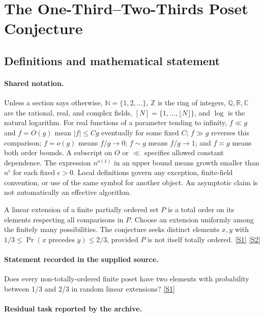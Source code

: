 \documentclass[11pt,a4paper]{article}
\newcommand{\N}{\mathbb{N}}
\newcommand{\Z}{\mathbb{Z}}
\newcommand{\Q}{\mathbb{Q}}
\newcommand{\R}{\mathbb{R}}
\newcommand{\C}{\mathbb{C}}
\newcommand{\sref}[2]{\hyperlink{source:#1:#2}{[S#2]}}
\begin{document}
\section{The One-Third--Two-Thirds Poset Conjecture}\label{statement}


\subsection{Definitions and mathematical statement}

\paragraph{Shared notation.}Unless a section says otherwise, $\N=\{1,2,\ldots\}$,
$\Z$ is the ring of integers, $\Q,\R,\C$ are the rational, real, and complex
fields, $[N]=\{1,\ldots,\lfloor N\rfloor\}$, and $\log$ is the natural
logarithm. For real functions of a parameter tending to infinity,
$f\ll g$ and $f=O(g)$ mean $|f|\leq Cg$ eventually for some fixed $C$;
$f\gg g$ reverses this comparison; $f=o(g)$ means $f/g\to0$;
$f\sim g$ means $f/g\to1$; and $f\asymp g$ means both order bounds.
A subscript on $O$ or $\ll$ specifies allowed constant dependence.
The expression $n^{o(1)}$ in an upper bound means growth smaller than
$n^\epsilon$ for each fixed $\epsilon>0$. Local definitions govern any
exception, finite-field convention, or use of the same symbol for another
object. An asymptotic claim is not automatically an effective algorithm.



A linear extension of a finite partially ordered set $P$ is a total order on its elements respecting all comparisons in $P$. Choose an extension uniformly among the finitely many possibilities. The conjecture seeks distinct elements $x,y$ with $1/3\leq\Pr(x\text{ precedes }y)\leq2/3$, provided $P$ is not itself totally ordered. \sref{statement}{1} \sref{statement}{2}

\paragraph{Statement recorded in the supplied source.}
Does every non-totally-ordered finite poset have two elements with probability between 1/3 and 2/3 in random linear extensions? \sref{statement}{1}

\paragraph{Residual task reported by the archive.}
\end{document}
